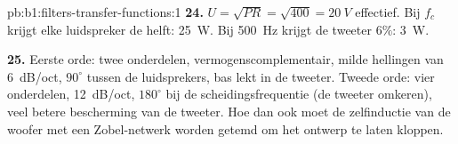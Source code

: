 \begin{solution}{pb:b1:filters-transfer-functions:1}
\textbf{24.} $U = \sqrt{PR} = \sqrt{400} = \qty{20}{V}$ effectief. Bij $f_c$ krijgt elke
luidspreker de helft: \qty{25}{W}. Bij \qty{500}{Hz} krijgt de tweeter $6\%$:
\qty{3}{W}.

\textbf{25.} Eerste orde: twee onderdelen, vermogenscomplementair, milde
hellingen van \qty{6}{dB/oct}, $90^\circ$ tussen de luidsprekers, bas lekt in de
tweeter. Tweede orde: vier onderdelen, \qty{12}{dB/oct}, $180^\circ$ bij de
scheidingsfrequentie (de tweeter omkeren), veel betere bescherming van de tweeter. Hoe dan
ook moet de zelfinductie van de woofer met een Zobel-netwerk worden getemd om het
ontwerp te laten kloppen.
\end{solution}
